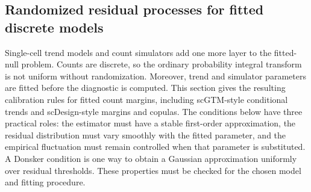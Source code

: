 \documentclass[preprint,12pt]{elsarticle}
\theoremstyle{plain}
\theoremstyle{remark}
\begin{document}
\subsection{Randomized residual processes for fitted discrete models}
\label{sec:scdesign}

Single-cell trend models and count simulators add one more layer to the
fitted-null problem. Counts are discrete, so the ordinary probability integral
transform is not uniform without randomization. Moreover, trend and simulator
parameters are fitted before the diagnostic is computed. This section gives
the resulting calibration rules for fitted count margins, including
scGTM-style conditional trends and scDesign-style margins and copulas.
The conditions below have three practical roles: the estimator must have a
stable first-order approximation, the residual distribution must vary smoothly
with the fitted parameter, and the empirical fluctuation must remain controlled
when that parameter is substituted. A Donsker condition is one way to obtain
a Gaussian approximation uniformly over residual thresholds. These properties
must be checked for the chosen model and fitting procedure.
\end{document}
